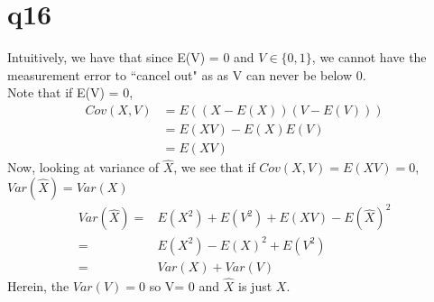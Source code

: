 \documentclass{article}
\begin{document}
\section*{q16}
Intuitively, we have that since E(V) = 0 and $V\in \{0,1\}$, we cannot have the measurement error to ``cancel out" as as V can never be below 0. \\
Note that if E(V) = 0,
\begin{align*}
Cov(X,V) &= E((X-E(X))(V-E(V))) \\
&= E(XV)-E(X)E(V) \\
& = E(XV)
\end{align*}
Now, looking at variance of $\hat X$, we see that if $Cov(X,V) = E(XV) = 0$, $Var(\hat X) = Var(X)$ 
\begin{align*}
Var(\hat X) =& E(X^2) + E(V^2) + E(XV) - E(\hat X)^2 \\
=& E(X^2) - E(X)^2 + E(V^2) \\
=& Var(X) + Var(V)
\end{align*}
Herein, the $Var(V) = 0 $ so V= 0 and $\hat X $ is just $X$. 
\end{document}
